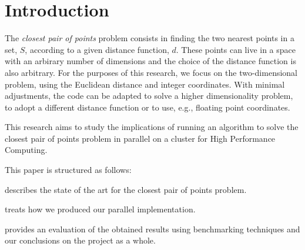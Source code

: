 \section{Introduction}
\label{sec:introduction}

The \textit{closest pair of points} problem consists
in finding the two nearest points in a set, $S$, according to a given distance function, $d$\cite{closest_pair_definition}.
These points can live in a space with an arbirary number of dimensions
and the choice of the distance function is also arbitrary.
For the purposes of this research, we focus on the two-dimensional problem, using the Euclidean distance and integer coordinates.
With minimal adjustments, the code can be adapted to solve a higher dimensionality problem, to adopt a different distance function or to use, e.g., floating point coordinates.

This research aims to study the implications of running an algorithm to solve the closest pair of points problem in parallel on a cluster for High Performance Computing.

This paper is structured as follows:
\begin{inlinelist}
    \item {} describes the state of the art for the closest pair of points problem.
    \item {} treats how we produced our parallel implementation.
    \item {} provides an evaluation of the obtained results using benchmarking techniques and our conclusions on the project as a whole.
\end{inlinelist}
